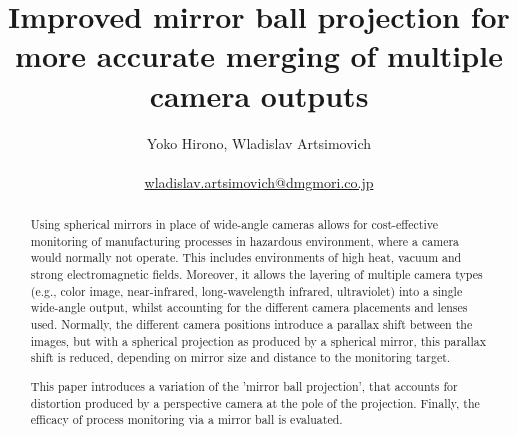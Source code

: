 \documentclass[10pt]{article}
\begin{document}
\title{Improved mirror ball projection for more accurate merging of multiple camera outputs}

\author{Yoko Hirono, Wladislav Artsimovich \\
	\\
	\href{mailto:wladislav.artsimovich@dmgmori.co.jp}{wladislav.artsimovich@dmgmori.co.jp}  \\
}

\maketitle

\begin{abstract}
	Using spherical mirrors in place of wide-angle cameras allows for cost-effective monitoring of manufacturing processes in hazardous environment, where a camera would normally not operate. This includes environments of high heat, vacuum and strong electromagnetic fields. Moreover, it allows the layering of multiple camera types (e.g., color image, near-infrared, long-wavelength infrared, ultraviolet) into a single wide-angle output, whilst accounting for the different camera placements and lenses used. Normally, the different camera positions introduce a parallax shift between the images, but with a spherical projection as produced by a spherical mirror, this parallax shift is reduced, depending on mirror size and distance to the monitoring target.

	This paper introduces a variation of the 'mirror ball projection', that accounts for distortion produced by a perspective camera at the pole of the projection. Finally, the efficacy of process monitoring via a mirror ball is evaluated.
\end{abstract}

\end{document}
